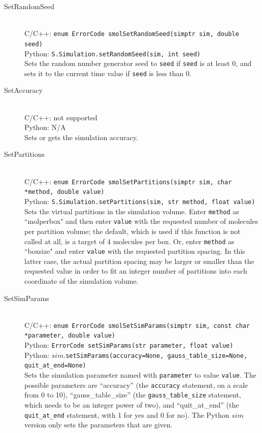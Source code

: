 \documentclass {scrbook}
\newcommand {\ttt} {\texttt}
\begin{document}
\begin{description}
\item[SetRandomSeed]
\hfill \\
C/C++: \ttt{enum ErrorCode smolSetRandomSeed(simptr sim, double seed)}\\
Python: \ttt{S.Simulation.setRandomSeed(sim, int seed)}\\
Sets the random number generator seed to \ttt{seed} if \ttt{seed} is at least 0, and sets it to the current time value if \ttt{seed} is less than 0.

\item[SetAccuracy]
\hfill \\
C/C++: not supported\\
Python: N/A\\
Sets or gets the simulation accuracy.

\item[SetPartitions]
\hfill \\
C/C++: \ttt{enum ErrorCode smolSetPartitions(simptr sim, char *method, double value)}\\
Python: \ttt{S.Simulation.setPartitions(sim, str method, float value)}\\
Sets the virtual partitions in the simulation volume. Enter \ttt{method} as ``molperbox" and then enter \ttt{value} with the requested number of molecules per partition volume; the default, which is used if this function is not called at all, is a target of 4 molecules per box. Or, enter \ttt{method} as ``boxsize" and enter \ttt{value} with the requested partition spacing. In this latter case, the actual partition spacing may be larger or smaller than the requested value in order to fit an integer number of partitions into each coordinate of the simulation volume.

\item[SetSimParams]
\hfill \\
C/C++: \ttt{enum ErrorCode smolSetSimParams(simptr sim, const char *parameter, double value)}\\
Python: \ttt{ErrorCode setSimParams(str parameter, float value)}\\
Python: $sim$.\ttt{setSimParams(accuracy=None, gauss\_table\_size=None, quit\_at\_end=None)}\\
Sets the simulation parameter named with \ttt{parameter} to value \ttt{value}. The possible parameters are ``accuracy'' (the \ttt{accuracy} statement, on a scale from 0 to 10), ``gauss\_table\_size'' (the \ttt{gauss\_table\_size} statement, which needs to be an integer power of two), and ``quit\_at\_end'' (the \ttt{quit\_at\_end} statement, with 1 for yes and 0 for no). The Python $sim$ version only sets the parameters that are given.


\end{description}
\end{document}
